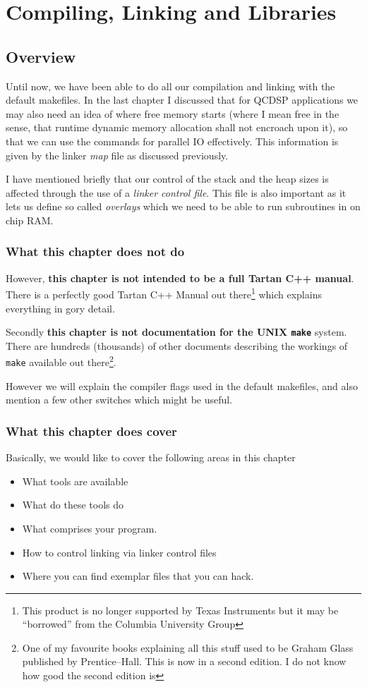 \chapter{Compiling, Linking and Libraries}
\section{Overview}
Until now, we have been able to do all our compilation and linking
with the default makefiles. In the last chapter I discussed that
for QCDSP applications we may also need an idea of where free memory
starts (where I mean free in the sense, that runtime dynamic memory 
allocation shall not encroach upon it), so that we can use the 
commands for parallel IO effectively. This information is given by
the linker {\em map} file as discussed previously.

I have mentioned briefly that our control of the stack and the heap 
sizes is affected through the use of a {\em linker control file}. This 
file is also important as it lets us define so called {\em overlays}
which we need to be able to run subroutines in on chip RAM.

\subsection{What this chapter does not do}
However, {\bf this chapter is not intended to be a full Tartan C++ manual}.
There is a perfectly good Tartan C++ Manual out there\footnote{This product is no longer supported by Texas Instruments but it may be ``borrowed'' from the 
Columbia University Group} which explains everything in gory detail.

Secondly {\bf this chapter is not documentation for the UNIX {\tt make}}
system. There are hundreds (thousands) of other documents describing the 
workings of {\tt make} available out there\footnote{One of my favourite books explaining all this stuff used to be Graham Glass published by Prentice--Hall. This is now in a second edition. I do not know how good the second edition is}.

However we will explain the compiler flags used in the default makefiles, 
and also mention a few other switches which might be useful. 

\subsection{What this chapter does cover}
Basically, we would like to cover the following areas in this chapter
\begin{itemize}
\item
What tools are available
\item
What do these tools do
\item
What comprises your program.
\item
How to control linking via linker control files
\item
Where you can find exemplar files that you can hack.
\end{itemize}


